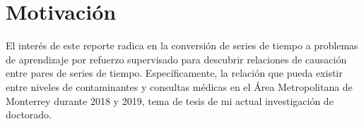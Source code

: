 \section{Motivación}

El interés de este reporte radica en la conversión de series de tiempo a problemas de aprendizaje por refuerzo supervisado para descubrir relaciones de causación entre pares de series de tiempo. Específicamente, la relación que pueda existir entre niveles de contaminantes y consultas médicas en el Área Metropolitana de Monterrey durante 2018 y 2019, tema de tesis de mi actual investigación de doctorado.